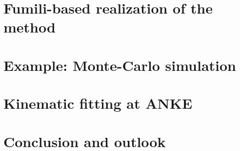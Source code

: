 \documentclass{webofc}
\begin{document}
\section{Fumili-based realization of the method}
% 

\section{Example: Monte-Carlo simulation}

\section{Kinematic fitting at ANKE}

\section{Conclusion and outlook}


% 


\end{document}
